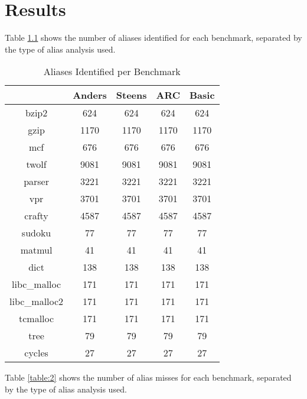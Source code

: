 \chapter{Results}

Table \ref{table:1} shows the number of aliases identified for each benchmark, separated by the type of alias analysis used.

\begin{table} [h!]
\centering
   \begin{tabular} {|c|c c c c|}
      \hline
      & Anders & Steens & ARC & Basic \\
      \hline
	   bzip2 & 624 & 624 & 624 & 624 \\
      \hline
	   gzip & 1170 & 1170 & 1170 & 1170 \\
      \hline
           mcf & 676 & 676 & 676 & 676 \\
      \hline
	   twolf & 9081 & 9081 & 9081 & 9081 \\
      \hline
	   parser & 3221 & 3221 & 3221 & 3221 \\
      \hline
	   vpr & 3701 & 3701 & 3701 & 3701 \\
      \hline
	   crafty & 4587 & 4587 & 4587 & 4587 \\
      \hline
	   sudoku & 77 & 77 & 77 & 77 \\
      \hline
	   matmul & 41 & 41 & 41 & 41 \\
      \hline
	   dict & 138 & 138 & 138 & 138 \\
      \hline
	   libc\_malloc & 171 & 171 & 171 & 171 \\
      \hline
	   libc\_malloc2 & 171 & 171 & 171 & 171 \\
      \hline
	   tcmalloc & 171 & 171 & 171 & 171 \\
      \hline
	   tree & 79 & 79 & 79 & 79 \\
      \hline
	   cycles & 27 & 27 & 27 & 27 \\
      \hline
   \end{tabular}
   \caption{Aliases Identified per Benchmark}
   \label{table:1}
\end{table}

\newpage

Table \ref{table:2} shows the number of alias misses for each benchmark, separated by the type of alias analysis used.

